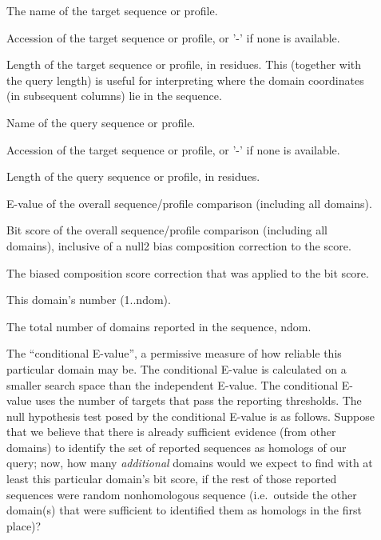 \begin{description}
\item[] The name of the target sequence or  profile.

\item[] Accession of the target sequence
  or profile, or '-' if none is available. 

\item[] Length of the target sequence or profile, in residues. 
  This (together with the query length) is useful for interpreting
  where the domain coordinates (in subsequent columns) lie in the
  sequence.

\item[] Name of the query sequence or profile.

\item[] Accession of the target sequence or
  profile, or '-' if none is available.

\item[]  Length of the query sequence or profile, in residues.

\item[] E-value of the overall sequence/profile
  comparison (including all domains).

\item[] Bit score of the overall sequence/profile
  comparison (including all domains), inclusive of a null2 bias
  composition correction to the score.

\item[] The biased composition score correction that
  was applied to the bit score.

\item[] This domain's number (1..ndom).

\item[] The total number of domains reported in the
  sequence, ndom.

\item[] The ``conditional E-value'', a
  permissive measure of how reliable this particular domain may be.
  The conditional E-value is calculated on a smaller search space than
  the independent E-value. The conditional E-value uses the number of
  targets that pass the reporting thresholds. The null hypothesis test
  posed by the conditional E-value is as follows. Suppose that we
  believe that there is already sufficient evidence (from other
  domains) to identify the set of reported sequences as homologs of
  our query; now, how many \emph{additional} domains would we expect
  to find with at least this particular domain's bit score, if the
  rest of those reported sequences were random nonhomologous sequence
  (i.e.\ outside the other domain(s) that were sufficient to
  identified them as homologs in the first place)?


\end{description}
